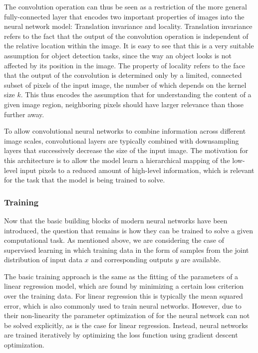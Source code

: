 \begin{description}
The convolution operation can thus be seen as a restriction of the more general
fully-connected layer that encodes two important properties of images into the
neural network model: Translation invariance and locality. Translation
invariance refers to the fact that the output of the convolution operation is
independent of the relative location within the image. It is easy to see that
this is a very suitable assumption for object detection tasks, since the way an
object looks is not affected by its position in the image. The property of
locality refers to the face that the output of the convolution is determined
only by a limited, connected subset of pixels of the input image, the number of
which depends on the kernel size $k$. This thus encodes the assumption that for
understanding the content of a given image region, neighboring pixels should
have larger relevance than those further away.


To allow convolutional neural networks to combine information across different
image scales, convolutional layers are typically combined with downsampling
layers that successively decrease the size of the input image. The motivation
for this architecture is to allow the model learn a hierarchical mapping of the
low-level input pixels to a reduced amount of high-level information, which is
relevant for the task that the model is being trained to solve.

\subsubsection{Training}

Now that the basic building blocks of modern neural networks have been
introduced, the question that remains is how they can be trained to solve a
given computational task. As mentioned above, we are considering the case of
supervised learning in which training data in the form of samples from the joint
distribution of input data $x$ and corresponding outputs $y$ are available.

The basic training approach is the same as the fitting of the parameters of a
linear regression model, which are found by minimizing a certain loss criterion
over the training data. For linear regression this is typically the mean squared
error, which is also commonly used to train neural networks. However, due to
their non-linearity the parameter optimization of for the neural network can not
be solved explicitly, as is the case for linear regression. Instead, neural
networks are trained iteratively by optimizing the loss function using gradient
descent optimization.


\end{description}
